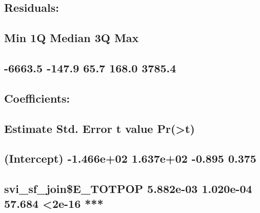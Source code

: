 \documentclass[
  12pt,
]{article}
\begin{document}
\hypertarget{section-35}{%
\subsection{}\label{section-35}}

\hypertarget{residuals-3}{%
\subsection{Residuals:}\label{residuals-3}}

\hypertarget{min-1q-median-3q-max-3}{%
\subsection{Min 1Q Median 3Q Max}\label{min-1q-median-3q-max-3}}

\hypertarget{section-36}{%
\subsection{-6663.5 -147.9 65.7 168.0 3785.4}\label{section-36}}

\hypertarget{section-37}{%
\subsection{}\label{section-37}}

\hypertarget{coefficients-3}{%
\subsection{Coefficients:}\label{coefficients-3}}

\hypertarget{estimate-std.-error-t-value-prt-3}{%
\subsection{Estimate Std. Error t value
Pr(\textgreater\textbar t\textbar)}\label{estimate-std.-error-t-value-prt-3}}

\hypertarget{intercept--1.466e02-1.637e02--0.895-0.375}{%
\subsection{(Intercept) -1.466e+02 1.637e+02 -0.895
0.375}\label{intercept--1.466e02-1.637e02--0.895-0.375}}

\hypertarget{svi_sf_joine_totpop-5.882e-03-1.020e-04-57.684-2e-16}{%
\subsection{svi\_sf\_join\$E\_TOTPOP 5.882e-03 1.020e-04 57.684
\textless2e-16
***}\label{svi_sf_joine_totpop-5.882e-03-1.020e-04-57.684-2e-16}}
\end{document}

